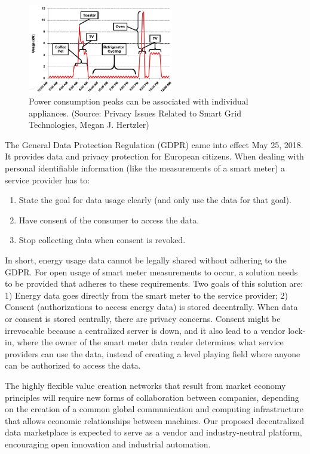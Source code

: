 \documentclass[conference]{IEEEtran}
\begin{document}
\begin{figure}[htbp]
    \centering
    \includegraphics[width=2.5in]{power_usage}
    \caption{Power consumption peaks can be associated with individual appliances. (Source: Privacy Issues Related to Smart Grid Technologies, Megan J. Hertzler)}
    \label{fig:power_usage}
\end{figure}

The General Data Protection Regulation (GDPR) came into effect  May 25, 2018. It provides data and privacy protection for European citizens. When dealing with personal identifiable information (like the measurements of a smart meter) a service provider has to:
\begin{enumerate}
    \item State the goal for data usage clearly (and only use the data for that goal).
    \item Have consent of the consumer to access the data.
    \item Stop collecting data when consent is revoked.
\end{enumerate}

In short, energy usage data cannot be legally shared without adhering to the GDPR. For open usage of smart meter measurements to occur, a solution needs to be provided that adheres to these requirements. Two goals of this solution are: 1) Energy data goes directly from the smart meter to the service provider; 2) Consent (authorizations to access energy data) is stored decentrally. When data or consent is stored centrally, there are privacy concerns. Consent might be irrevocable because a centralized server is down, and it also lead to a vendor lock-in, where the owner of the smart meter data reader determines what service providers can use the data, instead of creating a level playing field where anyone can be authorized to access the data.

The highly flexible value creation networks that result from market economy principles will require new forms of collaboration between companies, depending on the creation of a common global communication and computing infrastructure that allows economic relationships between machines. Our proposed decentralized data marketplace is expected to serve as a vendor and industry-neutral platform, encouraging open innovation and industrial automation.
\end{document}
